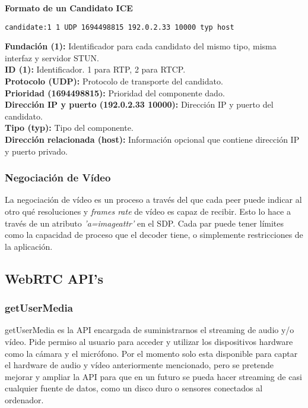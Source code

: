 \begin{normalsize}
\noindent \textbf{Formato de un Candidato ICE}\\
\end{normalsize}

\begin{lstlisting}[caption=Ejemplo paquete SDP]
candidate:1 1 UDP 1694498815 192.0.2.33 10000 typ host
\end{lstlisting}

\noindent \textbf{Fundación (1):} Identificador para cada candidato del mismo tipo, misma interfaz y servidor STUN.\\
\textbf{ID (1):} Identificador. 1 para RTP, 2 para RTCP.\\
\textbf{Protocolo (UDP):} Protocolo de transporte del candidato.\\
\textbf{Prioridad (1694498815): }Prioridad del componente dado.\\
\textbf{Dirección IP y puerto (192.0.2.33 10000): }Dirección IP y puerto del candidato.\\
\textbf{Tipo (typ):} Tipo del componente.\\
\textbf{Dirección relacionada (host):} Información opcional que contiene dirección IP y puerto privado.\\

\subsubsection{Negociación de Vídeo}

La negociación de vídeo es un proceso a través del que cada peer puede indicar al otro qué resoluciones y \textit{frames rate} de vídeo es capaz de recibir. Esto lo hace a través de un atributo \textit{'a=imageattr'} en el SDP. Cada par puede tener límites como la capacidad de proceso que el decoder tiene, o simplemente restricciones de la aplicación.\\


\subsection{WebRTC API's}

\subsubsection{getUserMedia} 

getUserMedia es la API encargada de suministrarnos el streaming de audio y/o vídeo. Pide permiso al usuario para acceder y utilizar los dispositivos hardware como la cámara y el micrófono. Por el momento solo esta disponible para captar el hardware de audio y vídeo anteriormente mencionado, pero se pretende mejorar y ampliar la API para que en un futuro se pueda hacer streaming de casi cualquier fuente de datos, como un disco duro o sensores conectados al ordenador.\\

